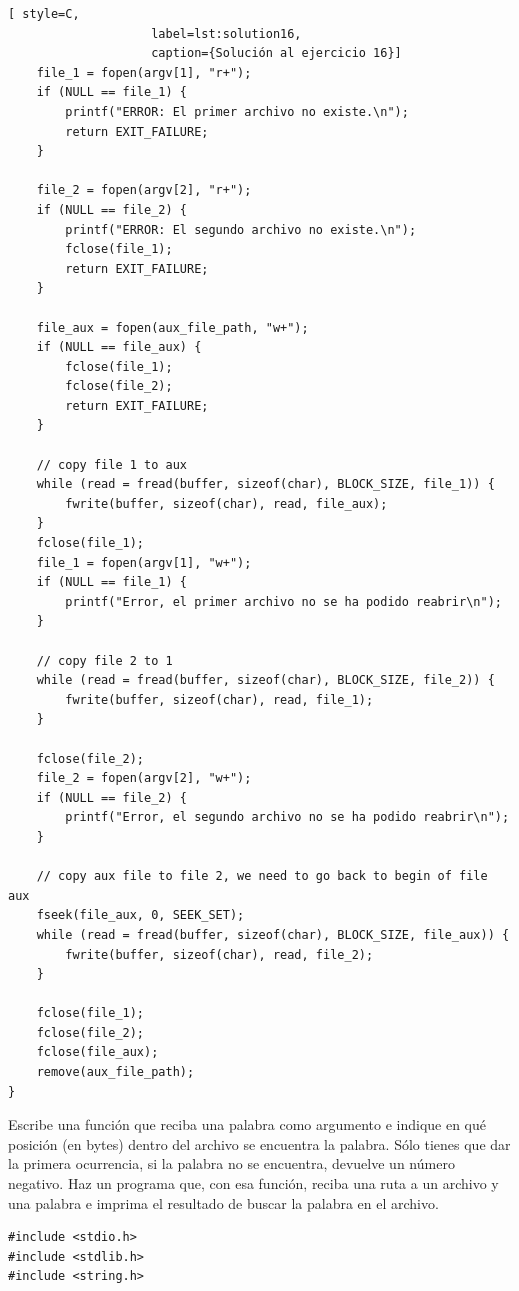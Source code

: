 \documentclass[a4paper]{article}
\begin{document}
\begin{exercises}
\begin{lstlisting}[ style=C,
                    label=lst:solution16,
                    caption={Solución al ejercicio 16}]
    file_1 = fopen(argv[1], "r+");
    if (NULL == file_1) {
        printf("ERROR: El primer archivo no existe.\n");
        return EXIT_FAILURE;
    }

    file_2 = fopen(argv[2], "r+");
    if (NULL == file_2) {
        printf("ERROR: El segundo archivo no existe.\n");
        fclose(file_1);
        return EXIT_FAILURE;
    }

    file_aux = fopen(aux_file_path, "w+");
    if (NULL == file_aux) {
        fclose(file_1);
        fclose(file_2);
        return EXIT_FAILURE;
    }

    // copy file 1 to aux
    while (read = fread(buffer, sizeof(char), BLOCK_SIZE, file_1)) {
        fwrite(buffer, sizeof(char), read, file_aux);
    }
    fclose(file_1);
    file_1 = fopen(argv[1], "w+");
    if (NULL == file_1) {
        printf("Error, el primer archivo no se ha podido reabrir\n");
    }

    // copy file 2 to 1
    while (read = fread(buffer, sizeof(char), BLOCK_SIZE, file_2)) {
        fwrite(buffer, sizeof(char), read, file_1);
    }

    fclose(file_2);
    file_2 = fopen(argv[2], "w+");
    if (NULL == file_2) {
        printf("Error, el segundo archivo no se ha podido reabrir\n");
    }

    // copy aux file to file 2, we need to go back to begin of file aux
    fseek(file_aux, 0, SEEK_SET);
    while (read = fread(buffer, sizeof(char), BLOCK_SIZE, file_aux)) {
        fwrite(buffer, sizeof(char), read, file_2);
    }

    fclose(file_1);
    fclose(file_2);
    fclose(file_aux);
    remove(aux_file_path);
}
\end{lstlisting}

\item Escribe una función que reciba una palabra como argumento e indique
en qué posición (en bytes) dentro del archivo se encuentra la palabra. Sólo
tienes que dar la primera ocurrencia, si la palabra no se encuentra, devuelve
un número negativo. Haz un programa que, con esa función, reciba una ruta a un
archivo y una palabra e imprima el resultado de buscar la palabra en el archivo.

\noindent
\begin{minipage}[H]{\linewidth}
\mbox{}
\begin{lstlisting}[style=C,
caption={Solución al ejercicio 17},
label={lst:solution17}]
#include <stdio.h>
#include <stdlib.h>
#include <string.h>


\end{lstlisting}
\end{minipage}
\end{exercises}
\end{document}
